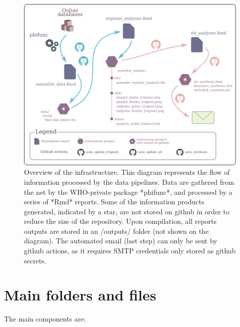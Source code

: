 \documentclass[]{book}
\begin{document}
\begin{figure}

{\centering \includegraphics{images/reports_structure} 

}

\caption{Overview of the infrastructure. This diagram represents the flow of information processed by the data pipelines. Data are gathered from the net by the WHO-private package *phifunc*, and processed by a series of *Rmd* reports. Some of the information products generated, indicated by a star, are not stored on github in order to reduce the size of the repository. Upon compilation, all reports outputs are stored in an /outputs/ folder (not shown on the diagram). The automated email (last step) can only be sent by github actions, as it requires SMTP credentials only stored as github secrets.}\label{fig:overview}
\end{figure}

\hypertarget{main-folders-and-files}{%
\section{Main folders and files}\label{main-folders-and-files}}

The main components are:
\end{document}

